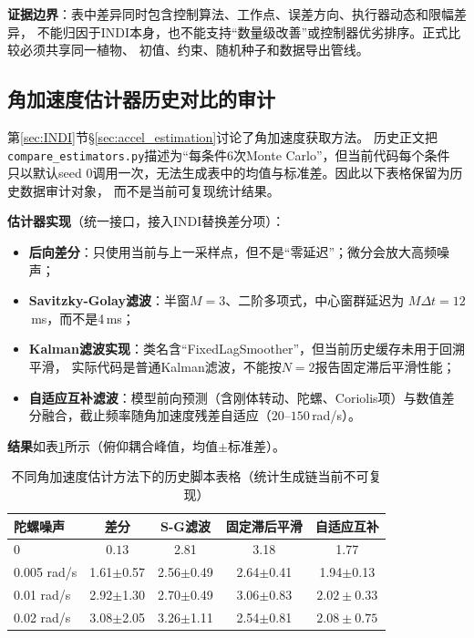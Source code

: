 \textbf{证据边界}：表中差异同时包含控制算法、工作点、误差方向、执行器动态和限幅差异，
不能归因于INDI本身，也不能支持“数量级改善”或控制器优劣排序。正式比较必须共享同一植物、
初值、约束、随机种子和数据导出管线。

\subsection{角加速度估计器历史对比的审计}
\label{sec:estimator_study}

第\ref{sec:INDI}节§\ref{sec:accel_estimation}讨论了角加速度获取方法。
历史正文把\texttt{compare\_estimators.py}描述为“每条件6次Monte Carlo”，但当前代码每个条件
只以默认seed 0调用一次，无法生成表中的均值与标准差。因此以下表格保留为历史数据审计对象，
而不是当前可复现统计结果。

\textbf{估计器实现}（统一接口，接入INDI替换差分项）：
\begin{itemize}
    \item \textbf{后向差分}：只使用当前与上一采样点，但不是“零延迟”；微分会放大高频噪声；
    \item \textbf{Savitzky-Golay滤波}：半窗$M=3$、二阶多项式，中心窗群延迟为
          $M\Delta t=12$\,ms，而不是4\,ms；
    \item \textbf{Kalman滤波实现}：类名含“FixedLagSmoother”，但当前历史缓存未用于回溯平滑，
          实际代码是普通Kalman滤波，不能按$N=2$报告固定滞后平滑性能；
    \item \textbf{自适应互补滤波}：模型前向预测（含刚体转动、陀螺、Coriolis项）与数值差分融合，截止频率随角加速度残差自适应（$20$--$150$\,rad/s）。
\end{itemize}

\textbf{结果}如表\ref{tab:estimator_compare}所示（俯仰耦合峰值，均值$\pm$标准差）。

\begin{table}[H]
\centering
\caption{不同角加速度估计方法下的历史脚本表格（统计生成链当前不可复现）}
\label{tab:estimator_compare}
\small
\begin{tabular}{l c c c c}
\toprule
\textbf{陀螺噪声} & \textbf{差分} & \textbf{S-G滤波} & \textbf{固定滞后平滑} & \textbf{自适应互补} \\
\midrule
0 & $\mathbf{0.13}$ & 2.81 & 3.18 & 1.77 \\
0.005 rad/s & 1.61$\pm$0.57 & 2.56$\pm$0.49 & 2.64$\pm$0.41 & 1.94$\pm$0.13 \\
0.01 rad/s & 2.92$\pm$1.30 & 2.70$\pm$0.49 & 3.06$\pm$0.83 & $\mathbf{2.02\pm0.33}$ \\
0.02 rad/s & 3.08$\pm$2.05 & 3.26$\pm$1.11 & 2.54$\pm$0.81 & $\mathbf{2.08\pm0.75}$ \\
\bottomrule
\end{tabular}
\end{table}

